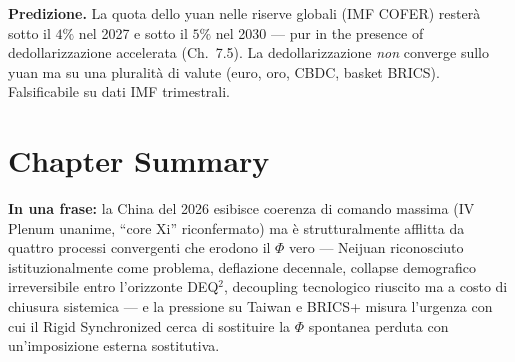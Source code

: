 \Conj{} \textbf{Predizione.} La quota dello yuan nelle riserve globali
(IMF COFER) resterà sotto il \(4\%\) nel 2027 e sotto il \(5\%\) nel
2030 --- pur in the presence of dedollarizzazione accelerata (Ch.~7.5). La
dedollarizzazione \emph{non} converge sullo yuan ma su una pluralità di
valute (euro, oro, CBDC, basket BRICS). Falsificabile su dati IMF
trimestrali.



\section{Chapter Summary}\label{sintesi-del-chapter}

\Proved{} \textbf{In una frase:} la China del 2026 esibisce coerenza di
comando massima (IV Plenum unanime, ``core Xi'' riconfermato) ma è
strutturalmente afflitta da quattro processi convergenti che erodono il
\(\Phi\) vero --- Neijuan riconosciuto istituzionalmente come problema,
deflazione decennale, collapse demografico irreversibile entro
l'orizzonte DEQ$^2$, decoupling tecnologico riuscito ma a costo di chiusura
sistemica --- e la pressione su Taiwan e BRICS+ misura l'urgenza con cui
il Rigid Synchronized cerca di sostituire la \(\Phi\) spontanea
perduta con un'imposizione esterna sostitutiva.

